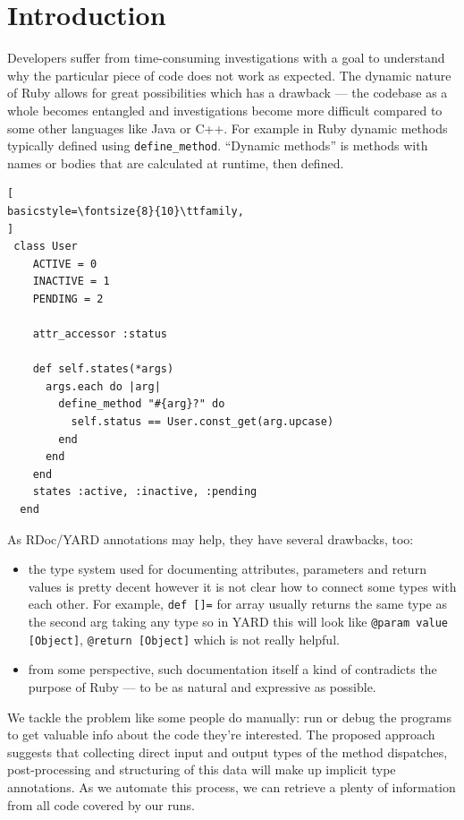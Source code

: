 \documentclass[conference]{IEEEtran}
\begin{document}
\section{Introduction}
Developers suffer from time-consuming investigations with a goal to understand why the particular piece of code does not
work as expected. The dynamic nature of Ruby allows for great possibilities which has a drawback — the codebase as a
whole becomes entangled and investigations become more difficult compared to some other languages like Java or C++. For
example in Ruby dynamic methods typically defined using \texttt{define\_method}. “Dynamic methods” is methods with names
or bodies that are calculated at runtime, then defined\cite{gradual_type}.
\begin{lstlisting}[
basicstyle=\fontsize{8}{10}\ttfamily,
]
 class User
    ACTIVE = 0
    INACTIVE = 1
    PENDING = 2

    attr_accessor :status

    def self.states(*args)
      args.each do |arg|
        define_method "#{arg}?" do
          self.status == User.const_get(arg.upcase)
        end
      end
    end
    states :active, :inactive, :pending
  end
\end{lstlisting}
As RDoc/YARD annotations may help, they have several drawbacks, too:


\begin{itemize}  
\item the type system used for documenting attributes, parameters and return values is pretty decent however it is not
  clear how to connect some types with each other. For example, \texttt{def []=} for array usually returns the same type
    as the second arg taking any type so in YARD this will look like \texttt{@param value [Object]}, \texttt{@return
    [Object]} which is not really helpful.
\item from some perspective, such documentation itself a kind of contradicts the purpose of Ruby — to be as natural and
  expressive as possible. 
\end{itemize}

We tackle the problem like some people do manually: run or debug the programs to get valuable info about the code
they're interested. The proposed approach suggests that collecting direct input and output types of the method
dispatches, post-processing and structuring of this data will make up implicit type annotations. As we automate this
process, we can retrieve a plenty of information from all code covered by our runs.
\end{document}
